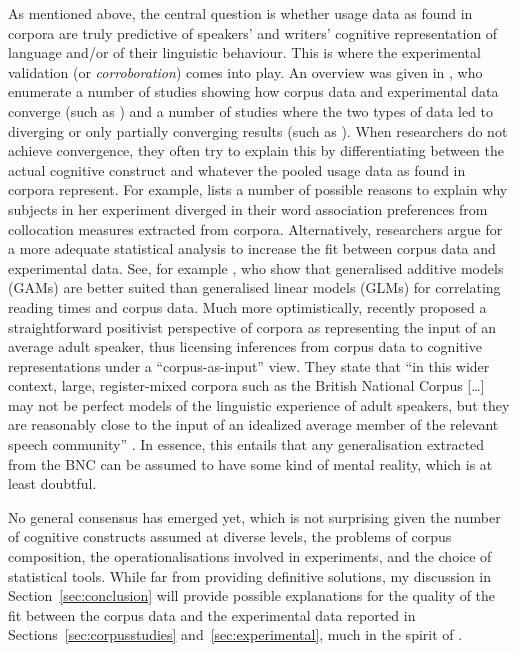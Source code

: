 As mentioned above, the central question is whether usage data as found in corpora are truly predictive of speakers' and writers' cognitive representation of language and\slash or of their linguistic behaviour.
This is where the experimental validation (or \textit{corroboration}) comes into play.
An overview was given in \cite{NewmanSorensenduncan2015}, who enumerate a number of studies showing how corpus data and experimental data converge (such as \citealp{BresnanEa2007,DurrantDoherty2010,GriesWulff2005,GriesEa2005}) and a number of studies where the two types of data led to diverging or only partially converging results (such as \citealp{ArppeJaervikivi2007,Dabrowska2014,Mollin2009}).
When researchers do not achieve convergence, they often try to explain this by differentiating between the actual cognitive construct and whatever the pooled usage data as found in corpora represent.
For example, \citet[411]{Dabrowska2014} lists a number of possible reasons to explain why subjects in her experiment diverged in their word association preferences from collocation measures extracted from corpora.
Alternatively, researchers argue for a more adequate statistical analysis to increase the fit between corpus data and experimental data.
See, for example \cite{DivjakEa2016}, who show that generalised additive models (GAMs) are better suited than generalised linear models (GLMs) for correlating reading times and corpus data. 
Much more optimistically, \cite{StefanowitschFlach2016} recently proposed a straightforward positivist perspective of corpora as representing the input of an average adult speaker, thus licensing inferences from corpus data to cognitive representations under a ``corpus-as-input'' view.
They state that ``in this wider context, large, register-mixed corpora such as the British National Corpus [\ldots] may not be perfect models of the linguistic experience of adult speakers, but they are reasonably close to the input of an idealized average member of the relevant speech community'' \citep[104]{StefanowitschFlach2016}.
In essence, this entails that any generalisation extracted from the BNC can be assumed to have some kind of mental reality, which is at least doubtful.

No general consensus has emerged yet, which is not surprising given the number of cognitive constructs assumed at diverse levels, the problems of corpus composition, the operationalisations involved in experiments, and the choice of statistical tools.
While far from providing definitive solutions, my discussion in Section~\ref{sec:conclusion} will provide possible explanations for the quality of the fit between the corpus data and the experimental data reported in Sections~\ref{sec:corpusstudies} and~\ref{sec:experimental}, much in the spirit of \citet{Dabrowska2014}.

